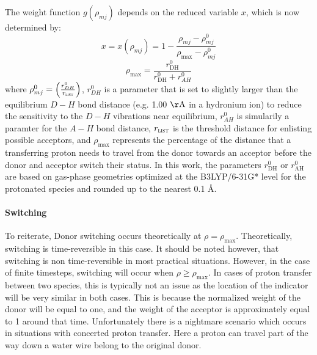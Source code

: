\documentclass{article}
\newcommand{\mr}[1]{\mathrm{#1}}
\begin{document}
The weight function $g ( \rho_{mj} )$ depends on the reduced variable $x$, which is now determined by:
\begin{equation}
x = x ( \rho_{mj} ) = 1 - \frac{\rho_{mj} - \rho^0_{mj}}{\rho_{\mathrm{max}} - \rho^0_{mj}}
\end{equation}
\begin{equation}
\rho_{\mathrm{max}} = \frac{r^0_{\mathrm{DH}}}{r^0_{\mathrm{DH}}+r^0_{AH}}
\end{equation}
where $\rho^0_{mj} = \left( \frac{r^0_{DH}}{r_{\mathrm{\textsc{list}}}} \right)$, $r^0_{DH}$ is a parameter that is set to slightly larger than the equilibrium $D-H$ bond distance (e.g. 1.00 $\mathrm{\AA}$ in a hydronium ion) to reduce the sensitivity to the $D-H$ vibrations near equilibrium, $r^0_{AH}$ is simularily a paramter for the $A-H$ bond distance, $r_{\mathrm{\textsc{list}}}$ is the threshold distance for enlisting possible acceptors, and $\rho_{\mathrm{max}}$ represents the percentage of the distance that a transferring proton needs to travel from the donor towards an acceptor before the donor and acceptor switch their status.
In this work, the parameters $r^0_{\mr{DH}}$ or $r^0_{\mr{AH}}$ are based on gas-phase geometries optimized at the B3LYP/6-31G* level for the protonated species and rounded up to the nearest 0.1 \AA.

\paragraph{Switching}
To reiterate, Donor switching occurs theoretically at $\rho = \rho_{\mr{max}}$.
Theoretically, switching is time-reversible in this case.
It should be noted however, that switching is non time-reversible in most practical situations. 
However, in the case of finite timesteps, switching will occur when $\rho \geq \rho_{\mr{max}}$.
In cases of proton transfer between two species, this is typically not an issue as the location of the indicator will be very similar in both cases.
This is because the normalized weight of the donor will be equal to one, and the weight of the acceptor is approximately equal to 1 around that time.
Unfortunately there is a nightmare scenario which occurs in situations with concerted proton transfer.
Here a proton can travel part of the way down a water wire belong to the original donor.
\end{document}
